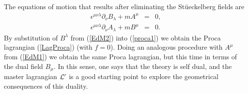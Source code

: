 \documentclass[a4paper,12pt]{article}
\newcommand{\eref}[1]{(\ref{#1})}
\begin{document}
The equations of motion that
results after eliminating the St\"ueckelberg fields are
\begin{eqnarray}
\epsilon^{\mu\nu\lambda}\partial_\nu B_\lambda+mA^\mu&=&0,\label{EdM1}\\
\epsilon^{\mu\nu\lambda}\partial_\nu A_\lambda+mB^\mu&=&0.\label{EdM2}
\end{eqnarray}
By substitution of $B^\lambda$ from \eref{EdM2} into
\eref{proca1} we obtain the Proca lagrangian \eref{LagProca}
(with $f=0$). Doing an analogous procedure with $A^\mu$ from
\eref{EdM1} we obtain the same Proca lagrangian, but this time in
terms of the dual field $B_\mu$. In this sense, one says that the
theory is self dual, and  the master lagrangian ${\cal L'}$ is a
good starting point to explore the geometrical consequences of
this duality.
\end{document}
